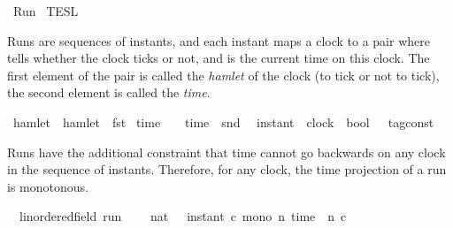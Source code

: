 %
\begin{isabellebody}%
%
%
\isadelimdocument
%
\endisadelimdocument
%
\isatagdocument
%
\isamarkuptrue%
%
\endisatagdocument
{\isafolddocument}%
%
\isadelimdocument
%
\endisadelimdocument
%
\isadelimtheory
%
\endisadelimtheory
%
\isatagtheory
{}\isamarkupfalse%
\ Run\isanewline
{}\ TESL\isanewline
\ \ \ \ \ \ \isanewline
{}%
\endisatagtheory
{\isafoldtheory}%
%
\isadelimtheory
%
\endisadelimtheory
%
\begin{isamarkuptext}%
Runs are sequences of instants, and each instant maps a clock to a pair 
   where  tells whether the clock ticks or not, 
  and  is the current time on this clock.
  The first element of the pair is called the \emph{hamlet} of the clock (to tick or 
  not to tick), the second element is called the \emph{time}.%
\end{isamarkuptext}\isamarkuptrue%
\isamarkupfalse%
\ hamlet\ \ {\isacartoucheopen}hamlet\ {\isasymequiv}\ fst{\isacartoucheclose}\isanewline
{}\isamarkupfalse%
\ time\ \ \ \ {\isacartoucheopen}time\ {\isasymequiv}\ snd{\isacartoucheclose}\isanewline
\isanewline
{}\isamarkupfalse%
\ {\isacharprime}{\isasymtau}\ instant\ {\isacharequal}\ {\isacartoucheopen}clock\ {\isasymRightarrow}\ {\isacharparenleft}bool\ {\isasymtimes}\ {\isacharprime}{\isasymtau}\ tag{\isacharunderscore}const{\isacharparenright}{\isacartoucheclose}%
\begin{isamarkuptext}%
Runs have the additional constraint that time cannot go backwards on any clock
  in the sequence of instants.
  Therefore, for any clock, the time projection of a run is monotonous.%
\end{isamarkuptext}\isamarkuptrue%
\isamarkupfalse%
\ {\isacharparenleft}\ {\isacharprime}{\isasymtau}{\isacharcolon}{\isacharcolon}linordered{\isacharunderscore}field\ run\ {\isacharequal}\isanewline
\ \ {\isacartoucheopen}{\isacharbraceleft}\ {\isasymrho}{\isacharcolon}{\isacharcolon}nat\ {\isasymRightarrow}\ {\isacharprime}{\isasymtau}\ instant{\isachardot}\ {\isasymforall}c{\isachardot}\ mono\ {\isacharparenleft}{\isasymlambda}n{\isachardot}\ time\ {\isacharparenleft}{\isasymrho}\ n\ c{\isacharparenright}{\isacharparenright}\ {\isacharbraceright}{\isacartoucheclose}\isanewline

\end{isabellebody}
